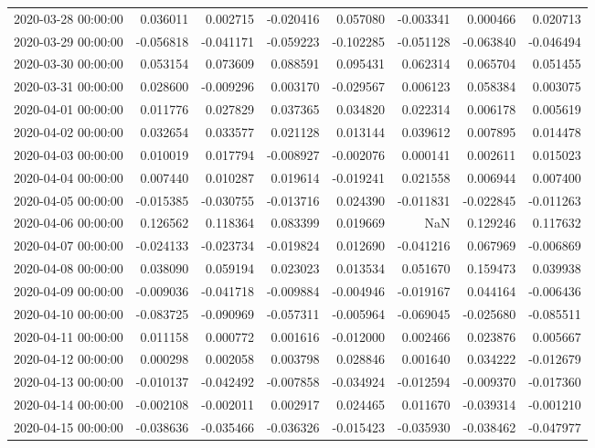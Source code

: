 \begin{tabular}{lrrrrrrr}
2020-03-28 00:00:00 & 0.036011 & 0.002715 & -0.020416 & 0.057080 & -0.003341 & 0.000466 & 0.020713 \\
2020-03-29 00:00:00 & -0.056818 & -0.041171 & -0.059223 & -0.102285 & -0.051128 & -0.063840 & -0.046494 \\
2020-03-30 00:00:00 & 0.053154 & 0.073609 & 0.088591 & 0.095431 & 0.062314 & 0.065704 & 0.051455 \\
2020-03-31 00:00:00 & 0.028600 & -0.009296 & 0.003170 & -0.029567 & 0.006123 & 0.058384 & 0.003075 \\
2020-04-01 00:00:00 & 0.011776 & 0.027829 & 0.037365 & 0.034820 & 0.022314 & 0.006178 & 0.005619 \\
2020-04-02 00:00:00 & 0.032654 & 0.033577 & 0.021128 & 0.013144 & 0.039612 & 0.007895 & 0.014478 \\
2020-04-03 00:00:00 & 0.010019 & 0.017794 & -0.008927 & -0.002076 & 0.000141 & 0.002611 & 0.015023 \\
2020-04-04 00:00:00 & 0.007440 & 0.010287 & 0.019614 & -0.019241 & 0.021558 & 0.006944 & 0.007400 \\
2020-04-05 00:00:00 & -0.015385 & -0.030755 & -0.013716 & 0.024390 & -0.011831 & -0.022845 & -0.011263 \\
2020-04-06 00:00:00 & 0.126562 & 0.118364 & 0.083399 & 0.019669 & NaN & 0.129246 & 0.117632 \\
2020-04-07 00:00:00 & -0.024133 & -0.023734 & -0.019824 & 0.012690 & -0.041216 & 0.067969 & -0.006869 \\
2020-04-08 00:00:00 & 0.038090 & 0.059194 & 0.023023 & 0.013534 & 0.051670 & 0.159473 & 0.039938 \\
2020-04-09 00:00:00 & -0.009036 & -0.041718 & -0.009884 & -0.004946 & -0.019167 & 0.044164 & -0.006436 \\
2020-04-10 00:00:00 & -0.083725 & -0.090969 & -0.057311 & -0.005964 & -0.069045 & -0.025680 & -0.085511 \\
2020-04-11 00:00:00 & 0.011158 & 0.000772 & 0.001616 & -0.012000 & 0.002466 & 0.023876 & 0.005667 \\
2020-04-12 00:00:00 & 0.000298 & 0.002058 & 0.003798 & 0.028846 & 0.001640 & 0.034222 & -0.012679 \\
2020-04-13 00:00:00 & -0.010137 & -0.042492 & -0.007858 & -0.034924 & -0.012594 & -0.009370 & -0.017360 \\
2020-04-14 00:00:00 & -0.002108 & -0.002011 & 0.002917 & 0.024465 & 0.011670 & -0.039314 & -0.001210 \\
2020-04-15 00:00:00 & -0.038636 & -0.035466 & -0.036326 & -0.015423 & -0.035930 & -0.038462 & -0.047977 \\

\end{tabular}
